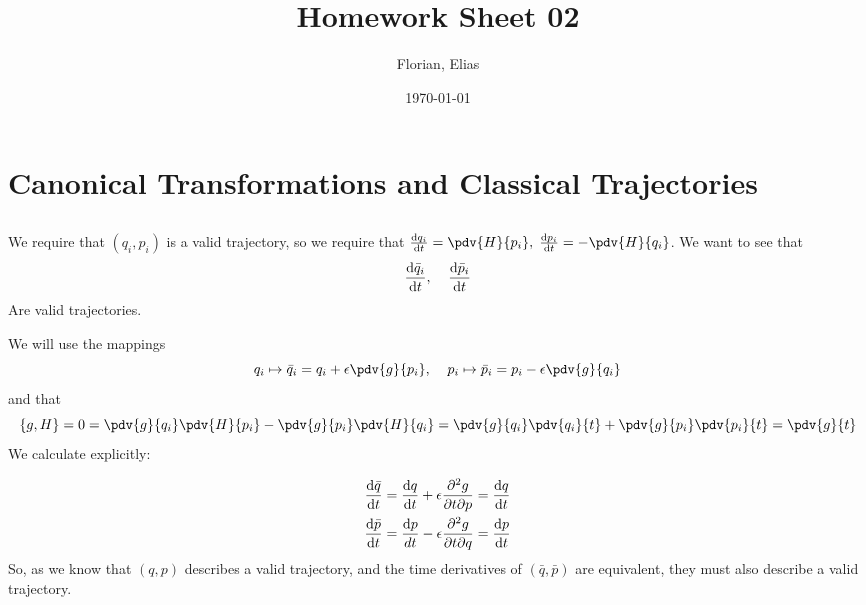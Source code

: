 \documentclass[]{scrartcl}
\title{Homework Sheet 02}
\author{Florian, Elias}
\date{\today}
\begin{document}
\maketitle
\newpage
\tableofcontents
\newpage

\section{Canonical Transformations and Classical Trajectories}
\subsection{}
We require that $(q_i, p_i)$ is a valid trajectory, so we require that $\frac{\text dq_i}{\text dt} = \pdv{H}{p_i},\;\frac{\text dp_i}{\text dt} = -\pdv{H}{q_i}$. We want to see that
$$
\frac{\text d \bar q_i}{\text dt},\;\;\;\;\frac{\text d \bar p_i}{\text dt}
$$
Are valid trajectories.

We will use the mappings
\begin{equation}
q_i \mapsto \bar q_i = q_i + \epsilon\pdv{g}{p_i},\;\;\;\; p_i \mapsto \bar p_i = p_i - \epsilon\pdv{g}{q_i}
\end{equation}
and that
$$
\{g,H\} = 0 = \pdv{g}{q_i}\pdv{H}{p_i} - \pdv{g}{p_i}\pdv{H}{q_i} = \pdv{g}{q_i}\pdv{q_i}{t} + \pdv{g}{p_i}\pdv{p_i}{t} = \pdv{g}{t}
$$
We calculate explicitly:

\begin{gather}
	\frac{\text d \bar q}{\text dt} = \frac{\text dq}{\text dt} + \epsilon \frac{\partial^2 g}{\partial t\partial p} = \frac{\text dq}{\text dt}\\
	\frac{\text d \bar p}{\text dt} = \frac{\text dp}{dt} - \epsilon \frac{\partial^2 g}{\partial t\partial q} = \frac{\text dp}{\text dt}
\end{gather}
So, as we know that $(q,p)$ describes a valid trajectory, and the time derivatives of $(\bar q,\bar p)$ are equivalent, they must also describe a valid trajectory.
\end{document}
